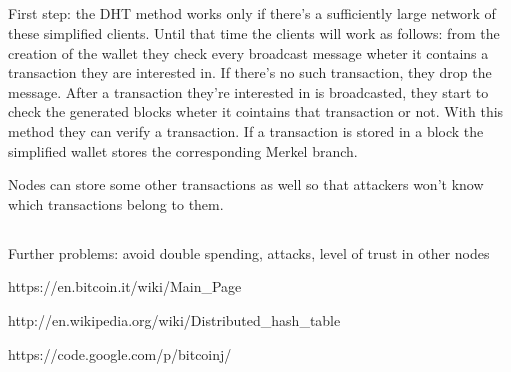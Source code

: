 \documentclass[a4paper,12pt]{article}
\begin{document}


\subsection{}
First step: the DHT method works only if there's a sufficiently large network of these simplified clients. Until that time the clients will work as follows: from the creation of the wallet they check every broadcast message wheter it contains a transaction they are interested in. If there's no such transaction, they drop the message. After a transaction they're interested in is broadcasted, they start to check the generated blocks wheter it cointains that transaction or not. With this method they can verify a transaction. If a transaction is stored in a block the simplified wallet stores the corresponding Merkel branch.

Nodes can store some other transactions as well so that attackers won't know which transactions belong to them.


\subsection{}
Further problems: avoid double spending, attacks, level of trust in other nodes




\newpage
\begin{thebibliography}{9}
\bibitem{}
https://en.bitcoin.it/wiki/Main\_Page
\label{bitcoinwiki}

\bibitem{}
http://en.wikipedia.org/wiki/Distributed\_hash\_table
\label{dhtwiki}

\bibitem{}
https://code.google.com/p/bitcoinj/
\label{bitcoinj}

\end{thebibliography}
\end{document}
